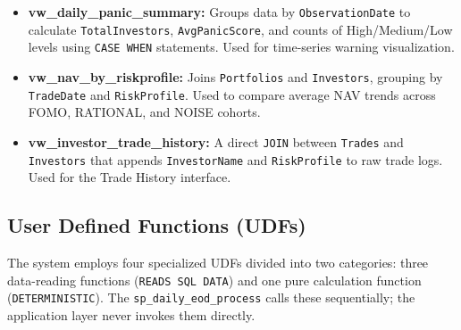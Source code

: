 \begin{itemize}
    \item \textbf{vw\_daily\_panic\_summary:} Groups data by \texttt{ObservationDate} to calculate \texttt{TotalInvestors}, \texttt{AvgPanicScore}, and counts of High/Medium/Low levels using \texttt{CASE WHEN} statements. Used for time-series warning visualization.
    
    \item \textbf{vw\_nav\_by\_riskprofile:} Joins \texttt{Portfolios} and \texttt{Investors}, grouping by \texttt{TradeDate} and \texttt{RiskProfile}. Used to compare average NAV trends across FOMO, RATIONAL, and NOISE cohorts.
    
    \item \textbf{vw\_investor\_trade\_history:} A direct \texttt{JOIN} between \texttt{Trades} and \texttt{Investors} that appends \texttt{InvestorName} and \texttt{RiskProfile} to raw trade logs. Used for the Trade History interface.
\end{itemize}

\subsection{User Defined Functions (UDFs)}
The system employs four specialized UDFs divided into two categories: three data-reading functions (\texttt{READS SQL DATA}) and one pure calculation function (\texttt{DETERMINISTIC}). The \texttt{sp\_daily\_eod\_process} calls these sequentially; the application layer never invokes them directly.

